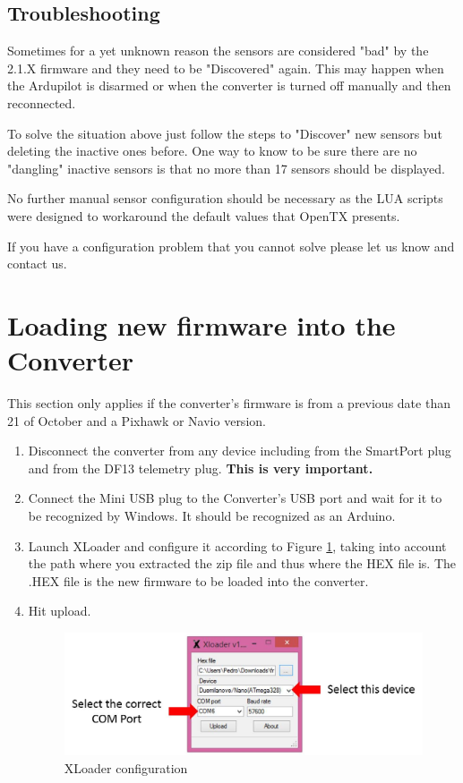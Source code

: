 \documentclass[english]{article}
\begin{document}
\subsection{Troubleshooting}

Sometimes for a yet unknown reason the sensors are considered "bad" by the 2.1.X firmware and they need to be "Discovered" again. This may happen when the Ardupilot is disarmed or when the converter is turned off manually and then reconnected.

To solve the situation above just follow the steps to "Discover" new sensors but deleting the inactive ones before. One way to know to be sure there are no "dangling" inactive sensors is that no more than 17 sensors should be displayed. 

No further manual sensor configuration should be necessary as the LUA scripts were designed to workaround the default values that OpenTX presents.

If you have a configuration problem that you cannot solve please let us know and contact us.

\section{Loading new firmware into the Converter}

This section only applies if the converter's firmware is from a previous date than 21 of October and a Pixhawk or Navio version.

\begin{enumerate}
\item Disconnect the converter from any device including from the SmartPort plug and from the DF13 telemetry plug. \textbf{This is very important.}

\item Connect the Mini USB plug to the Converter's USB port and wait for it to be recognized by Windows. It should be recognized as an Arduino.

\item Launch XLoader and configure it according to Figure \ref{fig:xloader}, taking into account the path where you extracted the zip file and thus where the HEX file is. The .HEX file is the new firmware to be loaded into the converter.

\item Hit upload.

\begin{figure}[h!]
\centering
\includegraphics[width=1.0\textwidth]{XLoader}
\caption{XLoader configuration}
\label{fig:xloader}
\end{figure}

\end{enumerate}
\end{document}
